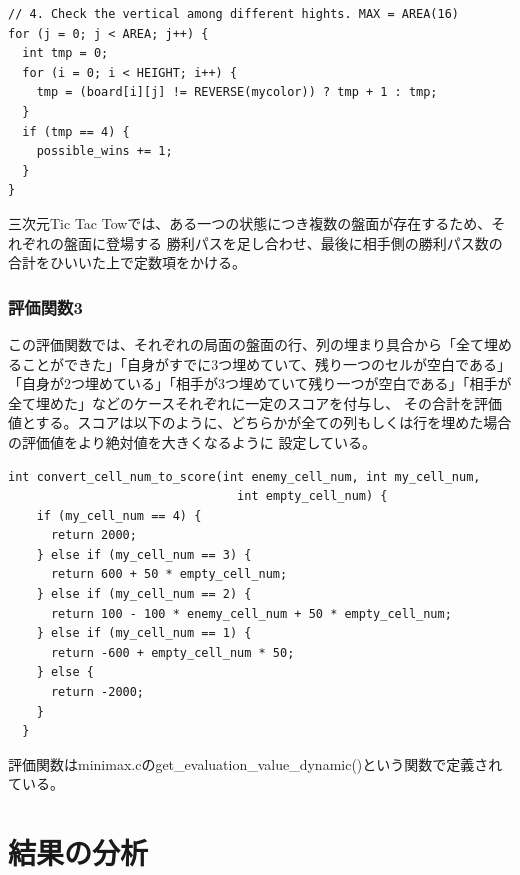 \documentclass[uplatex]{jsarticle}
\begin{document}
\begin{lstlisting}[basicstyle=\ttfamily\footnotesize, frame=single]
// 4. Check the vertical among different hights. MAX = AREA(16)
for (j = 0; j < AREA; j++) {
  int tmp = 0;
  for (i = 0; i < HEIGHT; i++) {
    tmp = (board[i][j] != REVERSE(mycolor)) ? tmp + 1 : tmp;
  }
  if (tmp == 4) {
    possible_wins += 1;
  }
}
\end{lstlisting}

三次元Tic Tac Towでは、ある一つの状態につき複数の盤面が存在するため、それぞれの盤面に登場する
勝利パスを足し合わせ、最後に相手側の勝利パス数の合計をひいいた上で定数項をかける。



\subsubsection{評価関数3}
この評価関数では、それぞれの局面の盤面の行、列の埋まり具合から「全て埋めることができた」「自身がすでに3つ埋めていて、残り一つのセルが空白である」
「自身が2つ埋めている」「相手が3つ埋めていて残り一つが空白である」「相手が全て埋めた」などのケースそれぞれに一定のスコアを付与し、
その合計を評価値とする。スコアは以下のように、どちらかが全ての列もしくは行を埋めた場合の評価値をより絶対値を大きくなるように
設定している。

\begin{lstlisting}[basicstyle=\ttfamily\footnotesize, frame=single]
  int convert_cell_num_to_score(int enemy_cell_num, int my_cell_num,
                                int empty_cell_num) {
    if (my_cell_num == 4) {
      return 2000;
    } else if (my_cell_num == 3) {
      return 600 + 50 * empty_cell_num;
    } else if (my_cell_num == 2) {
      return 100 - 100 * enemy_cell_num + 50 * empty_cell_num;
    } else if (my_cell_num == 1) {
      return -600 + empty_cell_num * 50;
    } else {
      return -2000;
    }
  }
\end{lstlisting}

評価関数はminimax.cのget\_evaluation\_value\_dynamic()という関数で定義されている。

\section{結果の分析}
\end{document}
